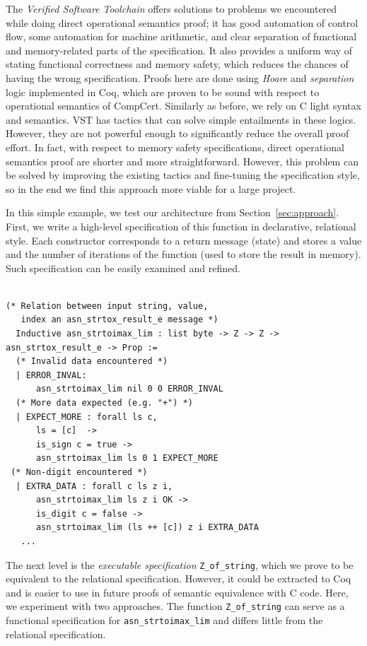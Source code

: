 \documentclass[10p,conference]{IEEEtran}
\begin{document}
The \textit{Verified Software Toolchain} \cite{VST} offers solutions
to problems we encountered while doing direct operational semantics
proof; it has good automation of control flow, some automation for
machine arithmetic, and clear separation of functional and
memory-related parts of the specification. It also provides a uniform
way of stating functional correctness and memory safety, which reduces
the chances of having the wrong specification. Proofs here are done
using \textit{Hoare} and \textit{separation} logic implemented in Coq,
which are proven to be sound with respect to operational semantics of
CompCert. Similarly as before, we rely on C light syntax and
semantics. VST has tactics that can solve simple entailments in these
logics. However, they are not powerful enough to significantly reduce
the overall proof effort. In fact, with respect to memory safety
specifications, direct operational semantics proof are shorter and
more straightforward. However, this problem can be solved by improving
the existing tactics and fine-tuning the specification style, so in
the end we find this approach more viable for a large project.

In this simple example, we test our architecture from
Section~\ref{sec:approach}. First, we write a high-level specification
of this function in declarative, relational style. Each constructor
corresponds to a return message (state) and stores a value and the
number of iterations of the function (used to store the result in
memory). Such specification can be easily examined and refined.

 \begin{lstlisting}[language=Coq]

(* Relation between input string, value, 
   index an asn_strtox_result_e message *)
  Inductive asn_strtoimax_lim : list byte -> Z -> Z -> asn_strtox_result_e -> Prop :=
  (* Invalid data encountered *)
  | ERROR_INVAL:
      asn_strtoimax_lim nil 0 0 ERROR_INVAL
  (* More data expected (e.g. "+") *)
  | EXPECT_MORE : forall ls c,
      ls = [c]  ->
      is_sign c = true ->
      asn_strtoimax_lim ls 0 1 EXPECT_MORE
 (* Non-digit encountered *)
  | EXTRA_DATA : forall c ls z i,
      asn_strtoimax_lim ls z i OK ->
      is_digit c = false -> 
      asn_strtoimax_lim (ls ++ [c]) z i EXTRA_DATA
   ...    
  \end{lstlisting}

  The next level is the \textit{executable specification}
  \texttt{Z\_of\_string}, which we prove to be equivalent to the
  relational specification. However, it could be extracted to Coq and
  is easier to use in future proofs of semantic equivalence with C
  code. Here, we experiment with two approaches. The function 
   \texttt{Z\_of\_string} can serve as a functional specification for
  \texttt{asn\_strtoimax\_lim} and differs little from the
  relational specification. 
\end{document}
